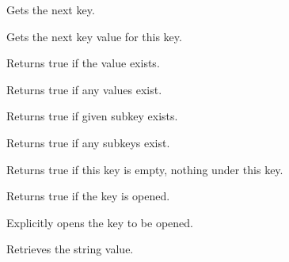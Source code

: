 Gets the next key.

\label{wxregkeygetnextvalue}


Gets the next key value for this key.

\label{wxregkeyhasvalue}


Returns true if the value exists.

\label{wxregkeyhasvalues}


Returns true if any values exist.

\label{wxregkeyhassubkey}


Returns true if given subkey exists.

\label{wxregkeyhassubkeys}


Returns true if any subkeys exist.

\label{wxregkeyisempty}


Returns true if this key is empty, nothing under this key.

\label{wxregkeyisopened}


Returns true if the key is opened.

\label{wxregkeyopen}


Explicitly opens the key to be opened.

\label{wxregkeyqueryvalue}


Retrieves the string value.


